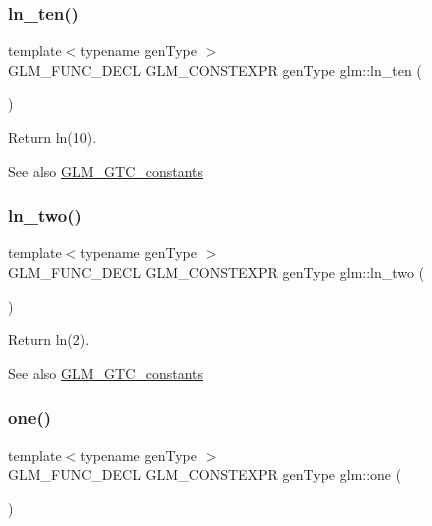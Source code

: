 \subsubsection{\texorpdfstring{ln\+\_\+ten()}{ln\_ten()}}
{\footnotesize\ttfamily template$<$typename gen\+Type $>$ \\
G\+L\+M\+\_\+\+F\+U\+N\+C\+\_\+\+D\+E\+CL G\+L\+M\+\_\+\+C\+O\+N\+S\+T\+E\+X\+PR gen\+Type glm\+::ln\+\_\+ten (\begin{DoxyParamCaption}{ }\end{DoxyParamCaption})}

Return ln(10). \begin{DoxySeeAlso}{See also}
\hyperlink{group__gtc__constants}{G\+L\+M\+\_\+\+G\+T\+C\+\_\+constants} 
\end{DoxySeeAlso}
\mbox{\label{group__gtc__constants_ga24f4d27765678116f41a2f336ab7975c}} 
\subsubsection{\texorpdfstring{ln\+\_\+two()}{ln\_two()}}
{\footnotesize\ttfamily template$<$typename gen\+Type $>$ \\
G\+L\+M\+\_\+\+F\+U\+N\+C\+\_\+\+D\+E\+CL G\+L\+M\+\_\+\+C\+O\+N\+S\+T\+E\+X\+PR gen\+Type glm\+::ln\+\_\+two (\begin{DoxyParamCaption}{ }\end{DoxyParamCaption})}

Return ln(2). \begin{DoxySeeAlso}{See also}
\hyperlink{group__gtc__constants}{G\+L\+M\+\_\+\+G\+T\+C\+\_\+constants} 
\end{DoxySeeAlso}
\mbox{\label{group__gtc__constants_ga39c2fb227631ca25894326529bdd1ee5}} 
\subsubsection{\texorpdfstring{one()}{one()}}
{\footnotesize\ttfamily template$<$typename gen\+Type $>$ \\
G\+L\+M\+\_\+\+F\+U\+N\+C\+\_\+\+D\+E\+CL G\+L\+M\+\_\+\+C\+O\+N\+S\+T\+E\+X\+PR gen\+Type glm\+::one (\begin{DoxyParamCaption}{ }\end{DoxyParamCaption})}

